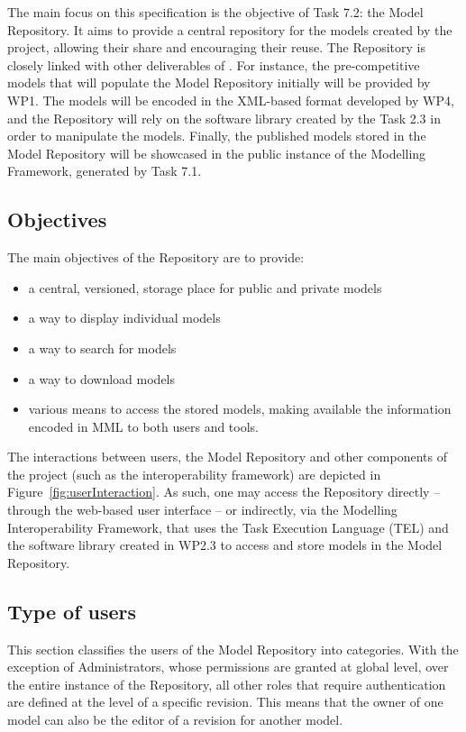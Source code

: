 The main focus on this specification is the objective of Task 7.2: the \ddmore Model Repository. It aims to provide a central repository for the models created by the project, allowing their share and encouraging their reuse. The Repository is closely linked with other deliverables of \ddmore. For instance, the pre-competitive models that will populate the Model Repository initially will be provided by WP1. The models will be encoded in the XML-based format developed by WP4, and the Repository will rely on the software library created by the Task 2.3 in order to manipulate the models. Finally, the published models stored in the \ddmore Model Repository will be showcased in the public instance of the Modelling Framework, generated by Task 7.1.

\subsection{Objectives}
\label{objectives}
The main objectives of the Repository are to provide:
\begin{itemize}
  \item a central, versioned, storage place for public and private models
  \item a way to display individual models
  \item a way to search for models
  \item a way to download models
  \item various means to access the stored \glspl{model}, making available the information encoded in MML to both users and tools. 
\end{itemize}

The interactions between users, the Model Repository and other components of the project (such as the interoperability framework) are depicted in Figure~\ref{fig:userInteraction}. As such, one may access the Repository directly -- through the web-based user interface -- or indirectly, via the Modelling Interoperability Framework, that uses the Task Execution Language (TEL) and the software library created in WP2.3 to access and store models in the \ddmore Model Repository.

\subsection{Type of users}
\label{users}
This section classifies the users of the \ddmore Model Repository into categories. With the exception of Administrators, whose permissions are granted at global level, over the entire instance of the Repository, all other roles that require authentication are defined at the level of a specific revision. This means that the owner of one model can also be the editor of a revision for another model. 


